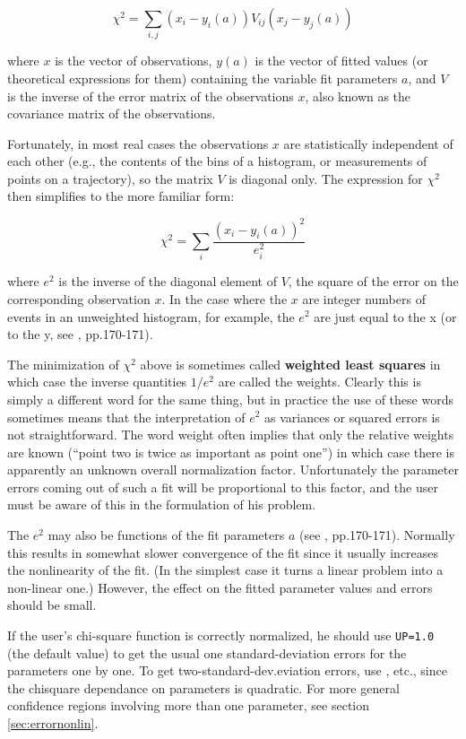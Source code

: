 \[ \chi^2 = \sum_{i,j} (x_i - y_i(a)) V_{ij} (x_j - y_j(a)) \]
 
where $x$ is the vector of observations, $y(a)$ is the vector of fitted 
values (or theoretical expressions for them) containing the variable 
fit parameters $a$, and $V$ is the inverse of the error matrix of the 
observations $x$, also known as the covariance matrix of the 
observations.
 
Fortunately, in most real cases the observations $x$ are statistically 
independent of each other (e.g., the contents of the bins of a 
histogram, or measurements of points on a trajectory), so the 
matrix $V$ is diagonal only. The expression for $\chi^2$ then simplifies to 
the more familiar form:
 
\[ \chi^2 = \sum_{i} \frac{(x_i - y_i(a))^2}{e_i^2} \]
 
where $e^2$ is the inverse of the diagonal element of $V$, the square of 
the error on the corresponding observation $x$. In the case where the $x$
are integer numbers of events in an unweighted histogram, for 
example, the $e^2$ are just equal to the x (or to the y, see \cite{bib-EADIE},
pp.170-171).
 
The minimization of $\chi^2$ above is sometimes called {\bf weighted least 
%
%
squares} in which case the inverse quantities $1/e^2$ are called the weights. 
Clearly this is simply a different word for the same thing, 
but in practice the use of these words sometimes means that the 
interpretation of $e^2$ as variances or squared errors is not 
straightforward. The word weight often implies that only the 
relative weights are known (``point two is twice as important as 
point one'') in which case there is apparently an unknown overall 
normalization factor. Unfortunately the parameter errors coming out 
of such a fit will be proportional to this factor, and the user must be 
aware of this in the formulation of his problem.
                                                                                               
The $e^2$ may also be functions of the fit parameters $a$ (see \cite{bib-EADIE},
pp.170-171). Normally this results in somewhat slower convergence 
of the fit since it usually increases the nonlinearity of the fit. (In 
the simplest case it turns a linear problem into a non-linear one.) 
However, the effect on the fitted parameter values and errors should 
be small.
 
If the user's chi-square function is correctly normalized, he should 
use \texttt{UP=1.0} (the default value) to get the usual 
one standard-deviation errors for the parameters one by one. 
To get two-standard-dev.eviation
errors, use , etc., 
since the chisquare dependance on 
parameters is quadratic. For more general confidence regions 
involving more than one parameter, see section \ref{sec:errornonlin}.
 
